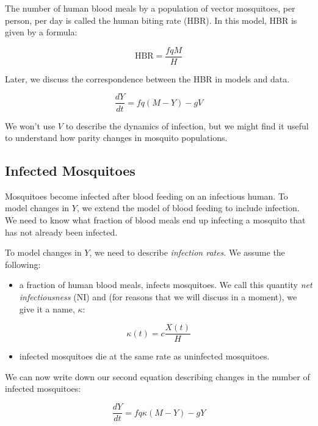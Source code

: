 \documentclass[
]{book}
\providecommand{\tightlist}{%
  \setlength{\itemsep}{0pt}\setlength{\parskip}{0pt}}
\begin{document}
The number of human blood meals by a population of vector mosquitoes, per person, per day is called the human biting rate (HBR). In this model, HBR is given by a formula:

\[\mbox{HBR} = \frac{fqM}{H}\]

Later, we discuss the correspondence between the HBR in models and data.

\begin{equation}
\frac{dY}{dt} = f q (M-Y) - g V
\end{equation}

We won't use \(V\) to describe the dynamics of infection, but we might find it useful to understand how parity changes in mosquito populations.

\subsection{Infected Mosquitoes}\label{infected-mosquitoes}

Mosquitoes become infected after blood feeding on an infectious human. To model changes in \(Y\), we extend the model of blood feeding to include infection. We need to know what fraction of blood meals end up infecting a mosquito that has not already been infected.

To model changes in \(Y\), we need to describe \emph{infection rates}. We assume the following:

\begin{itemize}
\tightlist
\item
  a fraction of human blood meals, infects mosquitoes. We call this quantity \emph{net infectiousness} (NI) and (for reasons that we will discuss in a moment), we give it a name, \(\kappa\):
\end{itemize}

\begin{equation}
\kappa(t) = c \frac{X(t)}{H}
\label{eq:kappaDef}
\end{equation}

\begin{itemize}
\tightlist
\item
  infected mosquitoes die at the same rate as uninfected mosquitoes.
\end{itemize}

We can now write down our second equation describing changes in the number of infected mosquitoes:

\begin{equation}
\frac{dY}{dt} = f q \kappa (M-Y) -g Y
\end{equation}
\end{document}
